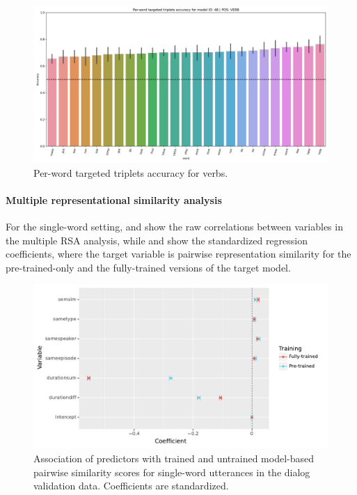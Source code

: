 \begin{figure}
  \centering
  \includegraphics[width=\textwidth]{results_VERB_word.png}
  \caption{Per-word targeted triplets accuracy for verbs.}
  \label{fig:accuracy_targeted_triplets_verbs}
\end{figure}


 
\paragraph{Multiple representational similarity analysis}

For the single-word setting, 
 and  show the raw
correlations between variables in the multiple RSA analysis, while
 and  show the
standardized regression coefficients, where the target variable is
pairwise representation similarity for the pre-trained-only and the
fully-trained versions of the target model.



\begin{figure}
  \centering
  \includegraphics[scale=0.66]{results/grsa_dialog_word_coef.pdf}
  \caption{Association of predictors with trained and untrained
    model-based pairwise similarity scores for single-word utterances
    in the dialog validation data. Coefficients are standardized.}
  \label{fig:coef_word_dialog}
\end{figure}


